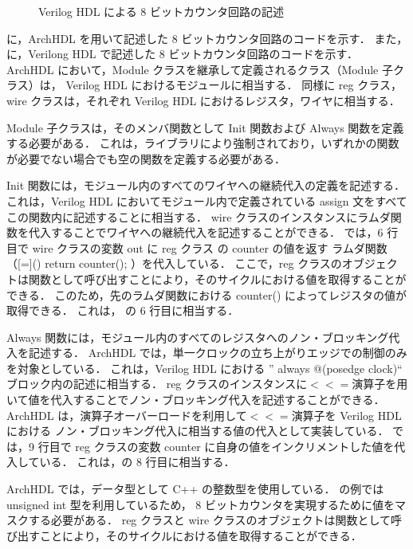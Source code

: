 \begin{figure}[t]
 
 \caption{Verilog HDL による 8 ビットカウンタ回路の記述}
 \label{src:counter_v}
\end{figure}

に，ArchHDL を用いて記述した 8 ビットカウンタ回路のコードを示す．
また， に，Verilong HDL で記述した 8 ビットカウンタ回路のコードを示す．
ArchHDL において，Module クラスを継承して定義されるクラス（Module 子クラス）は，
Verilog HDL におけるモジュールに相当する．
同様に reg クラス，wire クラスは，それぞれ Verilog HDL におけるレジスタ，ワイヤに相当する．

Module 子クラスは，そのメンバ関数として Init 関数および Always 関数を定義する必要がある．
これは，ライブラリにより強制されており，いずれかの関数が必要でない場合でも空の関数を定義する必要がある．

Init 関数には，モジュール内のすべてのワイヤへの継続代入の定義を記述する．
これは，Verilog HDL においてモジュール内で定義されている assign 文をすべてこの関数内に記述することに相当する．
wire クラスのインスタンスにラムダ関数を代入することでワイヤへの継続代入を記述することができる．
では，6 行目で wire クラスの変数 out に reg クラス の counter の値を返す
ラムダ関数（[=]() { return counter(); }）を代入している．
ここで，reg クラスのオブジェクトは関数として呼び出すことにより，そのサイクルにおける値を取得することができる．
このため，先のラムダ関数における counter() によってレジスタの値が取得できる．
これは， の 6 行目に相当する．

Always 関数には，モジュール内のすべてのレジスタへのノン・ブロッキング代入を記述する．
ArchHDL では，単一クロックの立ち上がりエッジでの制御のみを対象としている．
これは，Verilog HDL における '' always @(posedge clock)`` ブロック内の記述に相当する．
reg クラスのインスタンスに$<<=$演算子を用いて値を代入することでノン・ブロッキング代入を記述することができる．
ArchHDL は，演算子オーバーロードを利用して$<<=$演算子を Verilog HDL における
ノン・ブロッキング代入に相当する値の代入として実装している．
では，9 行目で reg クラスの変数 counter に自身の値をインクリメントした値を代入している．
これは，の 8 行目に相当する．

ArchHDL では，データ型として C++ の整数型を使用している．
の例では unsigned int 型を利用しているため，
8 ビットカウンタを実現するために値をマスクする必要がある．
reg クラスと wire クラスのオブジェクトは関数として呼び出すことにより，そのサイクルにおける値を取得することができる．

